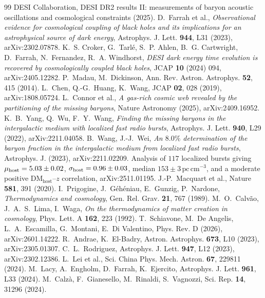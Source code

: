 \documentclass[11pt,a4paper]{article}
\begin{document}
\begin{thebibliography}{99}
 DESI Collaboration, DESI DR2 results II: measurements of baryon acoustic oscillations and cosmological constraints (2025).
 D.~Farrah et al., \emph{Observational evidence for cosmological coupling of black holes and its implications for an astrophysical source of dark energy}, Astrophys. J. Lett. \textbf{944}, L31 (2023), arXiv:2302.07878.
 K.~S. Croker, G.~Tarl\'e, S.~P. Ahlen, B.~G. Cartwright, D.~Farrah, N.~Fernandez, R.~A. Windhorst, \emph{DESI dark energy time evolution is recovered by cosmologically coupled black holes}, JCAP \textbf{10} (2024) 094, arXiv:2405.12282.
 P.~Madau, M.~Dickinson, Ann. Rev. Astron. Astrophys. \textbf{52}, 415 (2014).
 L.~Chen, Q.-G.~Huang, K.~Wang, JCAP \textbf{02}, 028 (2019), arXiv:1808.05724.
 L.~Connor et al., \emph{A gas-rich cosmic web revealed by the partitioning of the missing baryons}, Nature Astronomy (2025), arXiv:2409.16952.
 K.~B.~Yang, Q.~Wu, F.~Y.~Wang, \emph{Finding the missing baryons in the intergalactic medium with localized fast radio bursts}, Astrophys. J. Lett. \textbf{940}, L29 (2022), arXiv:2211.04058.
 B.~Wang, J.-J.~Wei, \emph{An $8.0\%$ determination of the baryon fraction in the intergalactic medium from localized fast radio bursts}, Astrophys. J. (2023), arXiv:2211.02209.
 Analysis of $117$ localized bursts giving $\mu_{\rm host} = 5.03 \pm 0.02$, $\sigma_{\rm host} = 0.96 \pm 0.03$, median $153 \pm 3\,\mathrm{pc\,cm^{-3}}$, and a moderate positive $\mathrm{DM_{host}}$--$z$ correlation, arXiv:2511.01195.
 J.-P.~Macquart et al., Nature \textbf{581}, 391 (2020).
 I.~Prigogine, J.~G\'eh\'eniau, E.~Gunzig, P.~Nardone, \emph{Thermodynamics and cosmology}, Gen. Rel. Grav. \textbf{21}, 767 (1989).
 M.~O.~Calv\~ao, J.~A.~S.~Lima, I.~Waga, \emph{On the thermodynamics of matter creation in cosmology}, Phys. Lett. A \textbf{162}, 223 (1992).
 T.~Schiavone, M.~De Angelis, L.~A.~Escamilla, G.~Montani, E.~Di Valentino, Phys. Rev. D (2026), arXiv:2601.14222.
 R.~Andrae, K.~El-Badry, Astron. Astrophys. \textbf{673}, L10 (2023), arXiv:2305.01307.
 C.~L.~Rodriguez, Astrophys. J. Lett. \textbf{947}, L12 (2023), arXiv:2302.12386.
 L.~Lei et al., Sci. China Phys. Mech. Astron. \textbf{67}, 229811 (2024).
 M.~Lacy, A.~Engholm, D.~Farrah, K.~Ejercito, Astrophys. J. Lett. \textbf{961}, L33 (2024).
 M.~Calz\`a, F.~Gianesello, M.~Rinaldi, S.~Vagnozzi, Sci. Rep. \textbf{14}, 31296 (2024).
\end{thebibliography}
\end{document}
